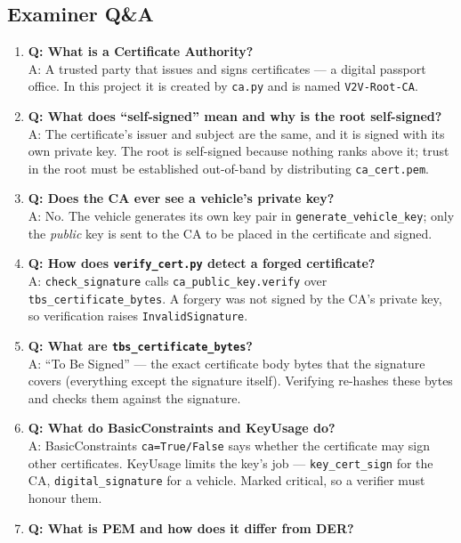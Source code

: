 \documentclass[11pt,a4paper]{report}
\begin{document}
\subsection{Examiner Q\&A}
\begin{enumerate}
  \item \textbf{Q: What is a Certificate Authority?}\\
        A: A trusted party that issues and signs certificates --- a digital
        passport office. In this project it is created by \texttt{ca.py} and is
        named \texttt{V2V-Root-CA}.
  \item \textbf{Q: What does ``self-signed'' mean and why is the root self-signed?}\\
        A: The certificate's issuer and subject are the same, and it is signed
        with its own private key. The root is self-signed because nothing ranks
        above it; trust in the root must be established out-of-band by
        distributing \texttt{ca\_cert.pem}.
  \item \textbf{Q: Does the CA ever see a vehicle's private key?}\\
        A: No. The vehicle generates its own key pair in
        \texttt{generate\_vehicle\_key}; only the \emph{public} key is sent to
        the CA to be placed in the certificate and signed.
  \item \textbf{Q: How does \texttt{verify\_cert.py} detect a forged certificate?}\\
        A: \texttt{check\_signature} calls \texttt{ca\_public\_key.verify} over
        \texttt{tbs\_certificate\_bytes}. A forgery was not signed by the CA's
        private key, so verification raises \texttt{InvalidSignature}.
  \item \textbf{Q: What are \texttt{tbs\_certificate\_bytes}?}\\
        A: ``To Be Signed'' --- the exact certificate body bytes that the
        signature covers (everything except the signature itself). Verifying
        re-hashes these bytes and checks them against the signature.
  \item \textbf{Q: What do BasicConstraints and KeyUsage do?}\\
        A: BasicConstraints \texttt{ca=True/False} says whether the certificate
        may sign other certificates. KeyUsage limits the key's job ---
        \texttt{key\_cert\_sign} for the CA, \texttt{digital\_signature} for a
        vehicle. Marked critical, so a verifier must honour them.
  \item \textbf{Q: What is PEM and how does it differ from DER?}\\

\end{enumerate}
\end{document}
